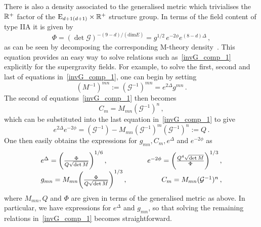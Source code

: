 \documentclass[debug]{phd}
\begin{document}
					There is also a density associated to the generalised metric which trivialises the $\mathbb{R}^+$ factor of the $\mathrm{E}_{d+1(d+1)} \times \mathbb{R}^+$ structure group. 
					In terms of the field content of type IIA it is given by
							\begin{equation}\label{gen_density}
								\Phi = (\det \mathcal{G})^{-(9-d)/ (\mathrm{dim} E)} = {g}^{1/2}\, e^{-2\phi} e^{(8-d)\Delta}\,,
							\end{equation}
					as can be seen by decomposing the corresponding M-theory density~\cite{Coimbra:2011ky}. 
					This equation provides an easy way to solve relations such as~\eqref{invG_comp_1} explicitly for the supergravity fields. For example, to solve the first, second and last of equations in~\eqref{invG_comp_1}, one can begin by setting
							\begin{equation}\label{fields_from_G_first}
								(M^{-1})^{mn} := (\mathcal{G}^{-1})^{mn} = e^{2\Delta}g^{mn}\,.
							\end{equation}
					The second of equations~\eqref{invG_comp_1} then becomes
							\begin{equation}
								C_m = M_{mn} (\mathcal{G}^{-1})^{n}\,,
							\end{equation}
					which can be substituted into the last equation in~\eqref{invG_comp_1} to give
							\begin{equation}
								e^{2\Delta} e^{-2\phi} = (\mathcal{G}^{-1}) - M_{mn} (\mathcal{G}^{-1})^{m} (\mathcal{G}^{-1})^{n} := Q\,.
							\end{equation}
					One then easily obtains the expressions for $g_{mn}, C_m, e^\Delta$ and $e^{-2\phi}$ as
							\begin{equation}\label{fields_from_G_last}
								\begin{array}{l c c r}
									e^\Delta = \bigg( \frac{\Phi}{Q \sqrt{\det M}} \bigg)^{1/6} \, ,		&	&	&	e^{-2\phi} = \bigg( \frac{Q^4 \sqrt{\det M}}{\Phi} \bigg)^{1/3} \, , \\
									g_{mn} = M_{mn} \bigg( \frac{\Phi}{Q \sqrt{\det M}} \bigg)^{1/3}\,, 	&	&	&	C_m = M_{mn} (\mathcal{G}^{-1})^n \, ,
								\end{array}
							\end{equation}
					where $M_{mn}, Q$ and $\Phi$ are given in terms of the generalised metric as above. 
					In particular, we have expressions for $e^\Delta$ and $g_{mn}$, so that solving the remaining relations in~\eqref{invG_comp_1} becomes straightforward.
\end{document}
